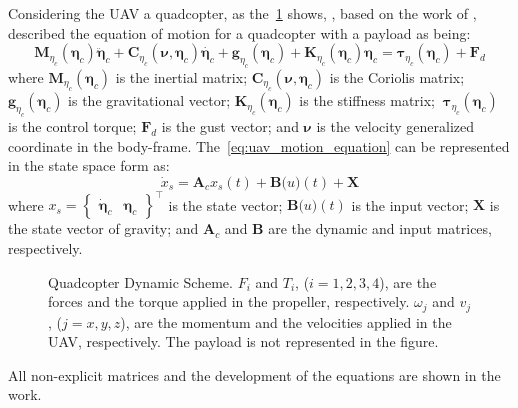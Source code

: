 Considering the UAV a quadcopter, as the~\cref{fig:quadcopter_forces_scheme} shows, \textcite{geronel2023}, based on the work of \textcite{fossen1994}, described the equation of motion for a quadcopter with a payload as being:
%
\begin{equation}
    \symbf{M}_{\eta_{c}}(\symbf{\eta}_c)\ddot{\symbf{\eta}}_c +
    \symbf{C}_{\eta_c}(\symbf{\nu},\symbf{\eta}_c)\dot{\symbf{\eta}_c} +
    \symbf{g}_{\eta_c}(\symbf{\eta}_c) +
    \symbf{K}_{\eta_c}(\symbf{\eta}_c)\symbf{\eta}_c =
    \symbf{\tau}_{\eta_c}(\symbf{\eta}_c) + 
    \symbf{F}_d
    \label{eq:uav_motion_equation}
\end{equation}
%
where \(\symbf{M}_{\eta_{c}}(\symbf{\eta}_c)\) is the inertial matrix; \(\symbf{C}_{\eta_c}(\symbf{\nu},\symbf{\eta}_c)\) is the Coriolis matrix; \(\symbf{g}_{\eta_c}(\symbf{\eta}_c)\) is the gravitational vector; \(\symbf{K}_{\eta_c}(\symbf{\eta}_c)\) is the stiffness matrix; \(\ \symbf{\tau}_{\eta_c}(\symbf{\eta}_c)\) is the control torque; \(\symbf{F}_d\) is the gust vector; and \(\symbf{\nu}\) is the velocity generalized coordinate in the body-frame. 
The~\cref{eq:uav_motion_equation} can be represented in the state space form as:
%
\begin{equation}
    \dot{x}_s = \symbf{A}_c x_s(t) + \symbf{B}\symbf(u)(t) + \symbf{X}
\end{equation}
%
where \(x_s = \begin{Bmatrix} \dot{\symbf{\eta}}_c & \symbf{\eta}_c \end{Bmatrix}^{\top}\) is the state vector; \(\symbf{B}\symbf(u)(t)\) is the input vector; \(\symbf{X}\) is the state vector of gravity; and \(\symbf{A}_c\) and \(\symbf{B}\) are the dynamic and input matrices, respectively.
%
\begin{figure}[!htb]
    \centering
    \caption[Quadcopter Dynamic Scheme]{Quadcopter Dynamic Scheme. \(F_i\) and \(T_i\), (\(i=1,2,3,4\)), are the forces and the torque applied in the propeller, respectively. \(\omega_j\) and \(v_j\), (\(j=x,y,z\)), are the momentum and the velocities applied in the UAV, respectively. The payload is not represented in the figure.}
    
    
    \label{fig:quadcopter_forces_scheme}
\end{figure}

All non-explicit matrices and the development of the equations are shown in the \textcite{geronel2023} work.

